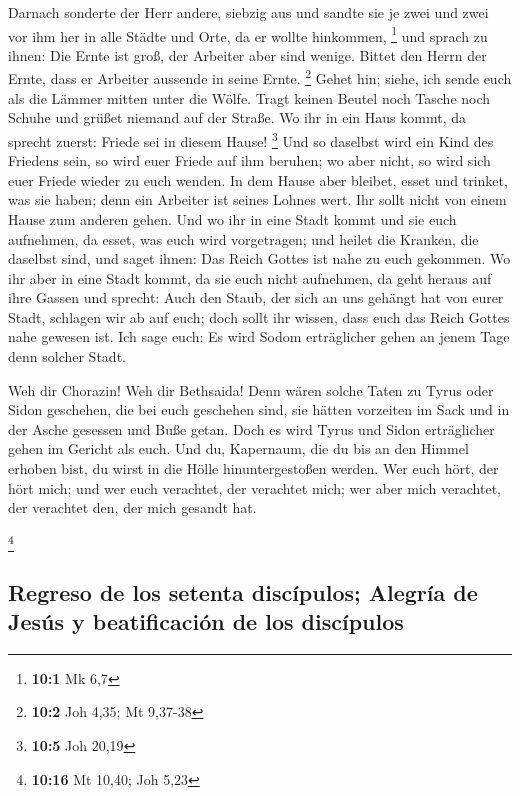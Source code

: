  Darnach sonderte der Herr andere, siebzig aus und sandte
sie je zwei und zwei vor ihm her in alle Städte und Orte, da er wollte
hinkommen, \footnote{\textbf{10:1} Mk 6,7}  und sprach zu
ihnen: Die Ernte ist groß, der Arbeiter aber sind wenige. Bittet den
Herrn der Ernte, dass er Arbeiter aussende in seine Ernte. \footnote{\textbf{10:2}
  Joh 4,35; Mt 9,37-38}  Gehet hin; siehe, ich sende euch
als die Lämmer mitten unter die Wölfe.  Tragt keinen
Beutel noch Tasche noch Schuhe und grüßet niemand auf der Straße.
 Wo ihr in ein Haus kommt, da sprecht zuerst: Friede sei
in diesem Hause! \footnote{\textbf{10:5} Joh 20,19}  Und
so daselbst wird ein Kind des Friedens sein, so wird euer Friede auf ihm
beruhen; wo aber nicht, so wird sich euer Friede wieder zu euch wenden.
 In dem Hause aber bleibet, esset und trinket, was sie
haben; denn ein Arbeiter ist seines Lohnes wert. Ihr sollt nicht von
einem Hause zum anderen gehen.  Und wo ihr in eine Stadt
kommt und sie euch aufnehmen, da esset, was euch wird vorgetragen;
 und heilet die Kranken, die daselbst sind, und saget
ihnen: Das Reich Gottes ist nahe zu euch gekommen.  Wo
ihr aber in eine Stadt kommt, da sie euch nicht aufnehmen, da geht
heraus auf ihre Gassen und sprecht:  Auch den Staub, der
sich an uns gehängt hat von eurer Stadt, schlagen wir ab auf euch; doch
sollt ihr wissen, dass euch das Reich Gottes nahe gewesen ist.
 Ich sage euch: Es wird Sodom erträglicher gehen an jenem
Tage denn solcher Stadt.

 Weh dir Chorazin! Weh dir Bethsaida! Denn wären solche
Taten zu Tyrus oder Sidon geschehen, die bei euch geschehen sind, sie
hätten vorzeiten im Sack und in der Asche gesessen und Buße getan.
 Doch es wird Tyrus und Sidon erträglicher gehen im
Gericht als euch.  Und du, Kapernaum, die du bis an den
Himmel erhoben bist, du wirst in die Hölle hinuntergestoßen werden.
 Wer euch hört, der hört mich; und wer euch verachtet,
der verachtet mich; wer aber mich verachtet, der verachtet den, der mich
gesandt hat.

\footnote{\textbf{10:16} Mt 10,40; Joh 5,23}

\hypertarget{regreso-de-los-setenta-discuxedpulos-alegruxeda-de-jesuxfas-y-beatificaciuxf3n-de-los-discuxedpulos}{%
\subsection{Regreso de los setenta discípulos; Alegría de Jesús y
beatificación de los
discípulos}\label{regreso-de-los-setenta-discuxedpulos-alegruxeda-de-jesuxfas-y-beatificaciuxf3n-de-los-discuxedpulos}}

